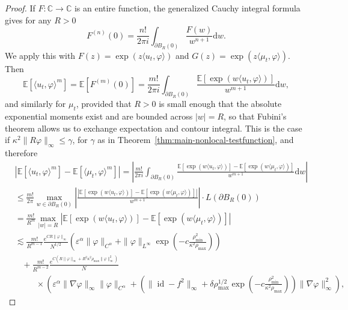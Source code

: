 \documentclass[a4paper,12pt]{article}
\newcommand{\mathd}{\mathrm{d}}
\newcommand{\C}{\mathbb{C}}
\begin{document}
\begin{proof}
    If $F:\C\to\C$ is an entire function, the generalized Cauchy integral formula gives for any $R > 0$
\[ F^{(n)} (0) = \frac{n!}{2 \pi i} \int_{\partial B_R (0)} \frac{F
   (w)}{w^{n + 1}} \mathd w. \]
We apply this with $F (z) = \exp (z \langle u_t, \varphi \rangle)$ and $G (z)
= \exp (z \langle \mu_t, \varphi \rangle)$. Then 
\[
    \mathbb{E} [\langle u_t, \varphi \rangle^m] =\mathbb{E} [F^{(m)} (0)] =
   \frac{m!}{2 \pi i} \int_{\partial B_R (0)} \frac{\mathbb{E} [\exp (w
   \langle u_t, \varphi \rangle)]}{w^{m + 1}} \mathd w,
\]
and similarly for $\mu_t$, provided that $R>0$ is small enough that the absolute exponential moments exist and are bounded across $|w|=R$, so that Fubini's theorem allows us to exchange expectation and contour integral. This is the case if $\kappa^2\|R\varphi\|_\infty \leq \gamma$, for $\gamma$ as in Theorem~\ref{thm:main-nonlocal-testfunction}, and therefore
\begin{align} \nonumber
  &| \mathbb{E} [\langle u_t, \varphi \rangle^m] -\mathbb{E} [\langle \mu_t,
  \varphi \rangle^m] | = \left| \frac{m!}{2 \pi i} \int_{\partial B_R
  (0)} \frac{\mathbb{E} [\exp (w \langle u_t, \varphi \rangle)] -\mathbb{E}
  [\exp (w \langle \mu_t, \varphi \rangle)]}{w^{m + 1}} \mathd w \right|\\ \nonumber
  & \leq \frac{m!}{2 \pi} \max_{w \in \partial B_R (0)} \left| \frac{|
  \mathbb{E} [\exp (w \langle u_t, \varphi \rangle)] -\mathbb{E} [\exp (w
  \langle \mu_t, \varphi \rangle)] |}{w^{m + 1}} \right| \cdot L (\partial B_R
  (0))\\ \nonumber
  &= \frac{m!}{R^m} \max_{| w | = R} | \mathbb{E} [\exp (w \langle u_t,
  \varphi \rangle)] -\mathbb{E} [\exp (w \langle \mu_t, \varphi \rangle)] | \\ \nonumber
  &\lesssim \frac{m!}{R^{m-1}}\frac{e^{CR\|\varphi\|_\infty}}{N^{1/2}}\left(\varepsilon^\alpha \|\varphi\|_{C^\alpha}
        + \|\varphi\|_{L^\infty} 
        \exp\left(-c \frac{\rho_{\min}^2}{\kappa^2\rho_{\max}}\right)\right)\\ \nonumber
    & \hspace{10pt}+ \frac{m!}{R^{m-2}}\frac{e^{C (R\| \varphi \|_{\infty} + R^2\kappa^2 \rho_{\max}\| \varphi \|_{\infty}^2 )}}{N}\\
    & \hspace{30pt} \times \left(\varepsilon^{\alpha} \|\nabla \varphi\|_\infty \| \varphi \|_{C^{\alpha}} + (\| \operatorname{id} - f^2 \|_{\infty} + \delta \rho_{\max}^{1/2} \exp\left(-c \frac{\rho_{\min}^2}{\kappa^2\rho_{\max}}\right)) \| \nabla \varphi \|_{\infty}^2\right), \label{eq:moment-pr1}

\end{align}
\end{proof}
\end{document}
